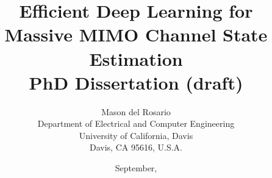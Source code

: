 \documentclass[12pt,letterpaper]{report}
\theoremstyle{mystyle}
\theoremstyle{mystyle2}
\theoremstyle{remark}
\begin{document}
\doublespacing
\renewcommand{\labelenumi}{(\arabic{enumi})}

\title{{\large \bf Efficient Deep Learning for Massive MIMO Channel State Estimation}%
	\vspace{0.2in}\\
	PhD Dissertation (draft)}
\author{Mason del Rosario\\
	Department of Electrical and Computer Engineering\\
	University of California, Davis\\
	Davis, CA 95616, U.S.A.\vspace{0.8in}
}

\date{September, \the\year}
\maketitle



\tableofcontents
\listoffigures
\listoftables

\newpage
{}







% 

\cleardoublepage
{}



\singlespacing
\appendix




\end{document}
